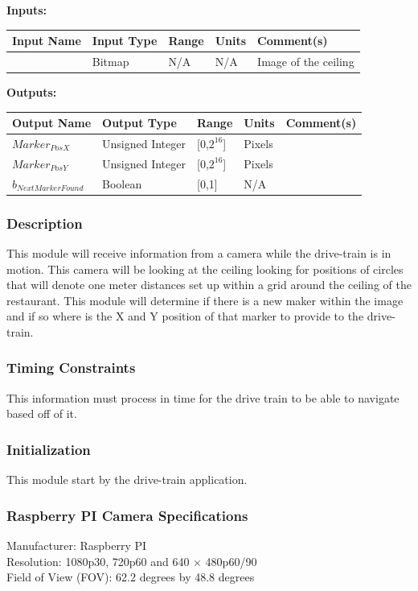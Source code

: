\documentclass [10pt]{article}
\begin{document}
\textbf{Inputs: } 

\begin{longtable}{|l|l|l|l|l|}\hline 
	\rowcolor{tableCell}Input Name & Input Type & Range & Units & Comment(s) \\ \hline
	 & Bitmap &  N/A & N/A & Image of the ceiling  \\ \hline
\end{longtable}

\textbf{Outputs: } 

\begin{longtable}{|l|l|l|l|l|}\hline 
	\rowcolor{tableCell}Output Name & Output Type & Range & Units & Comment(s) \\ \hline
	$ Marker_{PosX} $ & Unsigned Integer & [0,$2^{16}$] & Pixels &  \\ \hline
	$ Marker_{PosY} $ & Unsigned Integer & [0,$2^{16}$] & Pixels & \\ \hline
	$ b_{NextMarkerFound} $ & Boolean & [0,1] & N/A & \\ \hline
\end{longtable}

\subsubsection{Description}
This module will receive information from a camera while the drive-train is in motion. This camera will be looking at the ceiling looking for positions of circles that will denote one meter distances set up within a grid around the ceiling of the restaurant. This module will determine if there is a new maker within the image and if so where is the X and Y position of that marker to provide to the drive-train.

\subsubsection{Timing Constraints}
This information must process in time for the drive train to be able to navigate based off of it.

\subsubsection{Initialization}
This module start by the drive-train application.

\subsubsection{Raspberry PI Camera Specifications}
Manufacturer: Raspberry PI \\
Resolution: 1080p30, 720p60 and 640 × 480p60/90\\
Field of View (FOV): 62.2 degrees by 48.8 degrees\\
\end{document}
